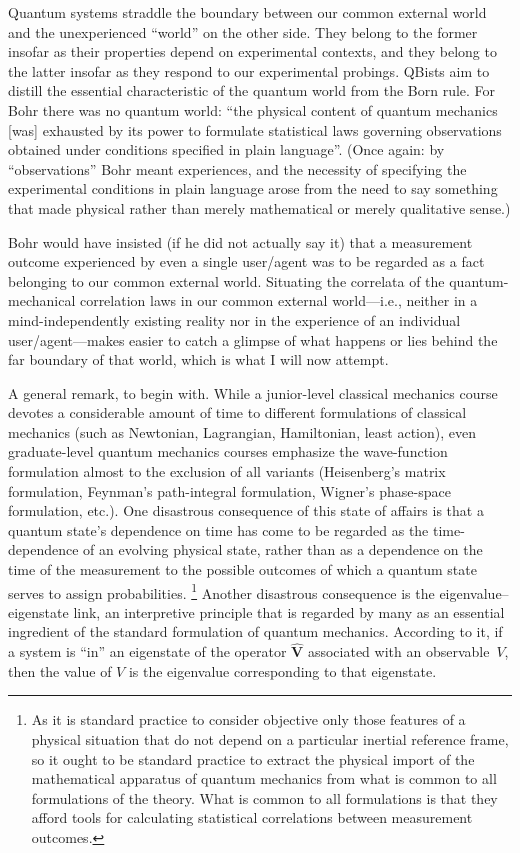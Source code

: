 \documentclass[smallextended]{svjour3}
\begin{document}
\noindent Quantum systems straddle the boundary between our common external world and the unexperienced ``world'' on the other side. They belong to the former insofar as their properties depend on experimental contexts, and they belong to the latter insofar as they respond to our experimental probings. QBists aim to distill the essential characteristic of the quantum world from the Born rule. For Bohr there was no quantum world\cite{Petersen1963}: ``the physical content of quantum mechanics [was] exhausted by its power to formulate statistical laws governing observations obtained under conditions specified in plain language''.\cite{Bohr-EAPHKp12} (Once again: by ``observations'' Bohr meant experiences, and the necessity of specifying the experimental conditions in plain language arose from the need to say something that made physical rather than merely mathematical or merely qualitative sense.)

Bohr would have insisted (if he did not actually say it) that a measurement outcome experienced by even a single user/agent was to be regarded as a fact belonging to our common external world. Situating the correlata of the quantum-mechanical correlation laws in our common external world---i.e., neither in a mind-independently existing reality nor in the experience of an individual user/agent---makes easier to catch a glimpse of what happens or lies behind the far boundary of that world, which is what I will now attempt. 

A general remark, to begin with. While a junior-level classical mechanics course devotes a considerable amount of time to different formulations of classical mechanics (such as Newtonian, Lagrangian, Hamiltonian, least action), even graduate-level quantum mechanics courses emphasize the wave-function formulation almost to the exclusion of all variants (Heisenberg's matrix formulation, Feynman's path-integral formulation, Wigner's phase-space formulation, etc.).\cite{Styeretal} One disastrous consequence of this state of affairs is that a quantum state's dependence on time has come to be regarded as the time-dependence of an evolving physical state, rather than as a dependence on the time of the measurement to the possible outcomes of which a quantum state serves to assign probabilities.%
\footnote{As it is standard practice to consider objective only those features of a physical situation that do not depend on a particular inertial reference frame, so it ought to be standard practice to extract the physical import of the mathematical apparatus of quantum mechanics from what is common to all formulations of the theory. What is common to all formulations is that they afford tools for calculating statistical correlations between measurement outcomes.}
Another disastrous consequence is the eigenvalue--eigenstate link, an {interpretive principle} that is regarded by many as an essential ingredient of the standard formulation of quantum mechanics.\cite{Gilton2016}  According to it, if a system is ``in'' an eigenstate of the operator $\mathbf{\hat V}$ associated with an observable~$V$, then the value of $V$ is the eigenvalue corresponding to that eigenstate.
\end{document}

